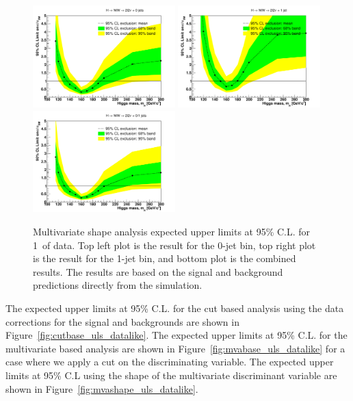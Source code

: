 \begin{figure}[!htbp]
\begin{center}
   \includegraphics[width=0.49\textwidth]{figures/limits_0j_1000pb_shape.pdf}
   \includegraphics[width=0.49\textwidth]{figures/limits_1j_1000pb_shape.pdf}
   \includegraphics[width=0.49\textwidth]{figures/limits_nj_1000pb_shape.pdf}
   \caption{Multivariate shape analysis expected upper limits at 95\% C.L. for 1\ifb\ of data. Top left plot 
   is the result for the 0-jet bin, top right plot is the result for the 1-jet bin, and 
   bottom plot is the combined results. The results 
   are based on the signal and background predictions directly from the simulation.}
   \label{fig:mvashape_uls}
\end{center}
\end{figure}

The expected upper limits at 95\% C.L. for the cut based analysis using the data 
corrections for the signal and backgrounds are shown in 
Figure~\ref{fig:cutbase_uls_datalike}. The expected upper limits at
95\% C.L. for the multivariate based analysis are shown in 
Figure~\ref{fig:mvabase_uls_datalike} for a case where we apply a cut on the 
discriminating variable. The expected upper limits at 95\% C.L using 
the shape of the multivariate discriminant variable are shown in 
Figure~\ref{fig:mvashape_uls_datalike}.

